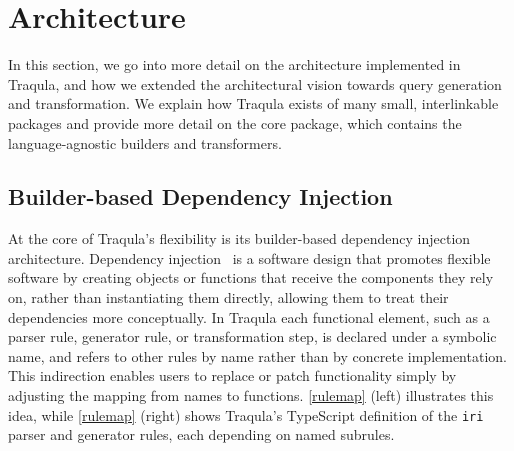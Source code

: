 \documentclass[runningheads]{llncs}
\begin{document}
    \section{Architecture}
    \label{architecture}

    In this section, we go into more detail on the architecture implemented in Traqula, and how we extended the
    architectural vision towards query generation and transformation.
    We explain how Traqula exists of many small, interlinkable packages
    and provide more detail on the core package, which contains the language-agnostic builders and transformers.

    \subsection{Builder-based Dependency Injection}

    At the core of Traqula's flexibility is its builder-based dependency injection architecture.
    Dependency injection~\cite{fowler-dep-inj} is a software design that promotes flexible software by
    creating objects or functions that receive the components they rely on, rather than instantiating them directly,
    allowing them to treat their dependencies more conceptually.
    In Traqula each functional element, such as a parser rule, generator rule, or transformation step,
    is declared under a symbolic name, and refers to other rules by name rather than by concrete implementation.
    This indirection enables users to replace or patch functionality simply by adjusting the mapping from names to functions.
    \autoref{rulemap} (left) illustrates this idea,
    while \autoref{rulemap} (right) shows Traqula's TypeScript definition of the \texttt{iri} parser and generator rules, each depending on named subrules.
\end{document}
